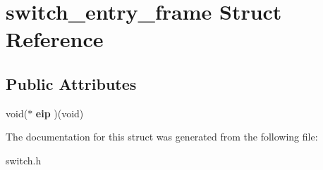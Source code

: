\hypertarget{structswitch__entry__frame}{}\section{switch\+\_\+entry\+\_\+frame Struct Reference}
\label{structswitch__entry__frame}
\subsection*{Public Attributes}
\begin{DoxyCompactItemize}
\item 
void($\ast$ {\bfseries eip} )(void)\hypertarget{structswitch__entry__frame_a521611ca37058e2aed783fa7ca7bd6b9}{}\label{structswitch__entry__frame_a521611ca37058e2aed783fa7ca7bd6b9}

\end{DoxyCompactItemize}


The documentation for this struct was generated from the following file\+:\begin{DoxyCompactItemize}
\item 
switch.\+h\end{DoxyCompactItemize}
